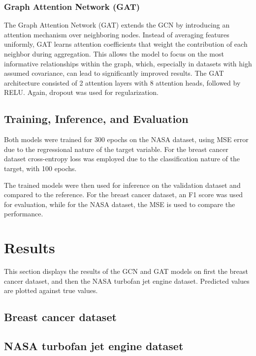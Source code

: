 \documentclass[12pt]{article}
\begin{document}
\subsubsection{Graph Attention Network (GAT)}
The Graph Attention Network (GAT) extends the GCN by introducing an attention mechanism over neighboring nodes. Instead of averaging features uniformly, GAT learns attention coefficients that weight the contribution of each neighbor during aggregation. This allows the model to focus on the most informative relationships within the graph, which, especially in datasets with high assumed covariance, can lead to significantly improved results.
The GAT architecture consisted of 2 attention layers with 8 attention heads, followed by RELU. Again, dropout was used for regularization.


\subsection{Training, Inference, and Evaluation}
Both models were trained for 300 epochs on the NASA dataset, using MSE error due to the regressional nature of the target variable.
For the breast cancer dataset cross-entropy loss was employed due to the classification nature of the target, with 100 epochs.

The trained models were then used for inference on the validation dataset and compared to the reference. For the breast cancer dataset, an F1 score was used for evaluation, while for the NASA dataset, the MSE is used to compare the performance.
\pagebreak
\section{Results}
This section displays the results of the GCN and GAT models on first the breast cancer dataset, and then the NASA turbofan jet engine dataset. Predicted values are plotted against true values.

\subsection{Breast cancer dataset}

\subsection{NASA turbofan jet engine dataset}
\end{document}
